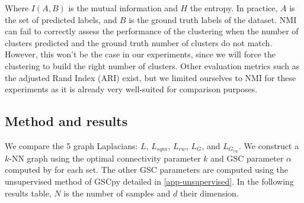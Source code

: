 \documentclass[a4paper,12pt]{article}
\theoremstyle{definition}
\theoremstyle{plain}
\begin{document}
Where $I(A,B)$ is the mutual information and $H$ the entropy. 
In practice, $A$ is the set of predicted labels, and $B$ is the ground truth labels of the dataset. NMI can fail to correctly assess the performance of the clustering when the number of clusters predicted and the ground truth number of clusters do not match. However, this won't be the case in our experiments, since we will force the clustering to build the right number of clusters.
Other evaluation metrics such as the adjusted Rand Index (ARI) exist, but we limited ourselves to NMI for these experiments as it is already very well-suited for comparison purposes.

\subsection{Method and results}
We compare the 5 graph Laplacians: $L$, $L_{sym}$, $L_{rw}$, $L_{G}$, and $L_{G_{rw}}$. We construct a $k$-NN graph using the optimal connectivity parameter $k$ and GSC parameter $\alpha$ computed by \cite[Jonckheere et al.]{GSC} for each set. The other GSC parameters are computed using the unsupervised method of GSCpy detailed in \ref{app-unsupervised}.
In the following results table, $N$ is the number of samples and $d$ their dimension.
\end{document}
